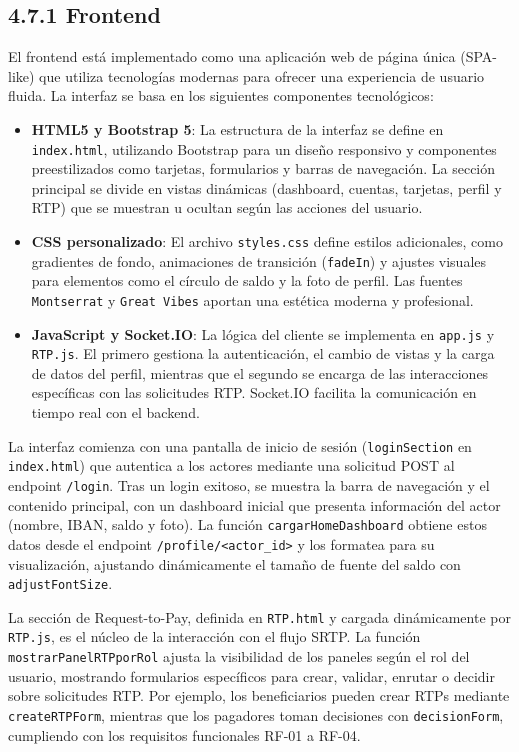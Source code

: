 \subsection*{4.7.1 \; Frontend}

El frontend está implementado como una aplicación web de página única (SPA-like) que utiliza tecnologías modernas para ofrecer una experiencia de usuario fluida. La interfaz se basa en los siguientes componentes tecnológicos:

\begin{itemize}
    \item \textbf{HTML5 y Bootstrap 5}: La estructura de la interfaz se define en \texttt{index.html}, utilizando Bootstrap para un diseño responsivo y componentes preestilizados como tarjetas, formularios y barras de navegación. La sección principal se divide en vistas dinámicas (dashboard, cuentas, tarjetas, perfil y RTP) que se muestran u ocultan según las acciones del usuario.
    \item \textbf{CSS personalizado}: El archivo \texttt{styles.css} define estilos adicionales, como gradientes de fondo, animaciones de transición (\texttt{fadeIn}) y ajustes visuales para elementos como el círculo de saldo y la foto de perfil. Las fuentes \texttt{Montserrat} y \texttt{Great Vibes} aportan una estética moderna y profesional.
    \item \textbf{JavaScript y Socket.IO}: La lógica del cliente se implementa en \texttt{app.js} y \texttt{RTP.js}. El primero gestiona la autenticación, el cambio de vistas y la carga de datos del perfil, mientras que el segundo se encarga de las interacciones específicas con las solicitudes RTP. Socket.IO facilita la comunicación en tiempo real con el backend.
\end{itemize}

La interfaz comienza con una pantalla de inicio de sesión (\texttt{loginSection} en \texttt{index.html}) que autentica a los actores mediante una solicitud POST al endpoint \texttt{/login}. Tras un login exitoso, se muestra la barra de navegación y el contenido principal, con un dashboard inicial que presenta información del actor (nombre, IBAN, saldo y foto). La función \texttt{cargarHomeDashboard} obtiene estos datos desde el endpoint \texttt{/profile/<actor\_id>} y los formatea para su visualización, ajustando dinámicamente el tamaño de fuente del saldo con \texttt{adjustFontSize}.

La sección de Request-to-Pay, definida en \texttt{RTP.html} y cargada dinámicamente por \texttt{RTP.js}, es el núcleo de la interacción con el flujo SRTP. La función \texttt{mostrarPanelRTPporRol} ajusta la visibilidad de los paneles según el rol del usuario, mostrando formularios específicos para crear, validar, enrutar o decidir sobre solicitudes RTP. Por ejemplo, los beneficiarios pueden crear RTPs mediante \texttt{createRTPForm}, mientras que los pagadores toman decisiones con \texttt{decisionForm}, cumpliendo con los requisitos funcionales RF-01 a RF-04.

